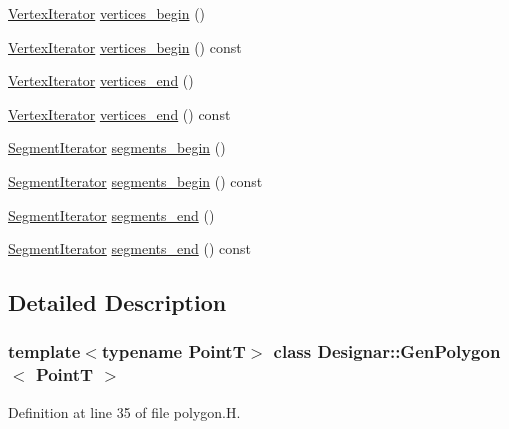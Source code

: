 \begin{DoxyCompactItemize}
\item 
\hyperlink{class_designar_1_1_gen_polygon_1_1_vertex_iterator}{Vertex\+Iterator} \hyperlink{class_designar_1_1_gen_polygon_a46604941ab9b33349086f7ca4b222869}{vertices\+\_\+begin} ()
\item 
\hyperlink{class_designar_1_1_gen_polygon_1_1_vertex_iterator}{Vertex\+Iterator} \hyperlink{class_designar_1_1_gen_polygon_a1a2dd20f7312fcba7649263f77e9f649}{vertices\+\_\+begin} () const
\item 
\hyperlink{class_designar_1_1_gen_polygon_1_1_vertex_iterator}{Vertex\+Iterator} \hyperlink{class_designar_1_1_gen_polygon_aad1c6e27b6288072e2821c65512ba2a4}{vertices\+\_\+end} ()
\item 
\hyperlink{class_designar_1_1_gen_polygon_1_1_vertex_iterator}{Vertex\+Iterator} \hyperlink{class_designar_1_1_gen_polygon_ad409613d032d91895921d60e27250a14}{vertices\+\_\+end} () const
\item 
\hyperlink{class_designar_1_1_gen_polygon_1_1_segment_iterator}{Segment\+Iterator} \hyperlink{class_designar_1_1_gen_polygon_a6957491e673b75a7106de2a19dd20f2e}{segments\+\_\+begin} ()
\item 
\hyperlink{class_designar_1_1_gen_polygon_1_1_segment_iterator}{Segment\+Iterator} \hyperlink{class_designar_1_1_gen_polygon_a66bce31d11cd12f7f3d6731d3d23bb77}{segments\+\_\+begin} () const
\item 
\hyperlink{class_designar_1_1_gen_polygon_1_1_segment_iterator}{Segment\+Iterator} \hyperlink{class_designar_1_1_gen_polygon_a1812e03e19df8a1363989b271955ea66}{segments\+\_\+end} ()
\item 
\hyperlink{class_designar_1_1_gen_polygon_1_1_segment_iterator}{Segment\+Iterator} \hyperlink{class_designar_1_1_gen_polygon_aa8e70075cae9a4a726bc8635d2cd527b}{segments\+\_\+end} () const
\end{DoxyCompactItemize}


\subsection{Detailed Description}
\subsubsection*{template$<$typename PointT$>$\newline
class Designar\+::\+Gen\+Polygon$<$ Point\+T $>$}



Definition at line 35 of file polygon.\+H.



